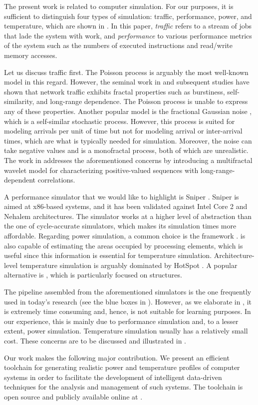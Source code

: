 The present work is related to computer simulation. For our purposes, it is
sufficient to distinguish four types of simulation: traffic, performance, power,
and temperature, which are shown in . In this paper,
\emph{traffic} refers to a stream of jobs that lade the system with work, and
\emph{performance} to various performance metrics of the system such as the
numbers of executed instructions and read/write memory accesses.

Let us discuss traffic first. The Poisson process \cite{lifshits2014} is
arguably the most well-known model in this regard. However, the seminal work in
\cite{leland1994} and subsequent studies have shown that network traffic
exhibits fractal properties such as burstiness, self-similarity, and long-range
dependence. The Poisson process is unable to express any of these properties.
Another popular model is the fractional Gaussian noise \cite{lifshits2014},
which is a self-similar stochastic process. However, this process is suited for
modeling arrivals per unit of time but not for modeling arrival or inter-arrival
times, which are what is typically needed for simulation. Moreover, the noise
can take negative values and is a monofractal process, both of which are
unrealistic. The work in \cite{riedi1999} addresses the aforementioned concerns
by introducing a multifractal wavelet model for characterizing positive-valued
sequences with long-range-dependent correlations.

A performance simulator that we would like to highlight is Sniper
\cite{carlson2011}. Sniper is aimed at x86-based systems, and it has been
validated against Intel Core 2 and Nehalem architectures. The simulator works at
a higher level of abstraction than the one of cycle-accurate simulators, which
makes its simulation times more affordable. Regarding power simulation, a common
choice is the  framework \cite{li2009}.  is also capable of
estimating the areas occupied by processing elements, which is useful since this
information is essential for temperature simulation. Architecture-level
temperature simulation is arguably dominated by HotSpot \cite{skadron2004}. A
popular alternative is  \cite{sridhar2010}, which is particularly
focused on  structures.

The pipeline assembled from the aforementioned simulators is the one frequently
used in today's research (see the blue boxes in ). However, as
we elaborate in , it is extremely time consuming and, hence,
is not suitable for learning purposes. In our experience, this is mainly due to
performance simulation and, to a lesser extent, power simulation. Temperature
simulation usually has a relatively small cost. These concerns are to be
discussed and illustrated in .

Our work makes the following major contribution. We present an efficient
toolchain for generating realistic power and temperature profiles of computer
systems in order to facilitate the development of intelligent data-driven
techniques for the analysis and management of such systems. The toolchain is
open source and publicly available online at \cite{sources}.
